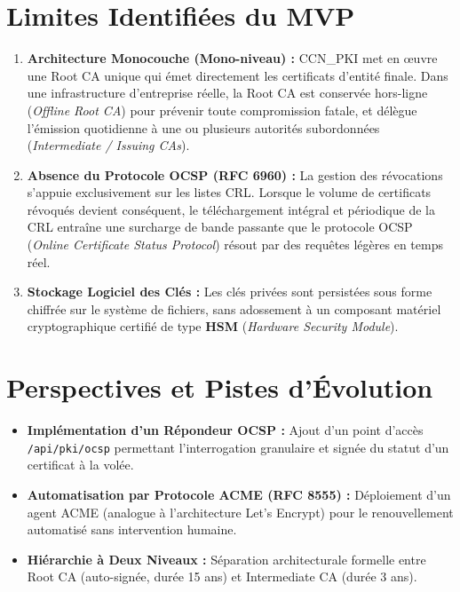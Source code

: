 \documentclass[12pt,a4paper]{report}
\begin{document}
\section{Limites Identifiées du MVP}
\begin{enumerate}
    \item \textbf{Architecture Monocouche (Mono-niveau) :} CCN\_PKI met en œuvre une Root CA unique qui émet directement les certificats d'entité finale. Dans une infrastructure d'entreprise réelle, la Root CA est conservée hors-ligne (\textit{Offline Root CA}) pour prévenir toute compromission fatale, et délègue l'émission quotidienne à une ou plusieurs autorités subordonnées (\textit{Intermediate / Issuing CAs}).
    \item \textbf{Absence du Protocole OCSP (RFC 6960) :} La gestion des révocations s'appuie exclusivement sur les listes CRL. Lorsque le volume de certificats révoqués devient conséquent, le téléchargement intégral et périodique de la CRL entraîne une surcharge de bande passante que le protocole OCSP (\textit{Online Certificate Status Protocol}) résout par des requêtes légères en temps réel.
    \item \textbf{Stockage Logiciel des Clés :} Les clés privées sont persistées sous forme chiffrée sur le système de fichiers, sans adossement à un composant matériel cryptographique certifié de type \textbf{HSM} (\textit{Hardware Security Module}).
\end{enumerate}

\section{Perspectives et Pistes d'Évolution}
\begin{itemize}
    \item \textbf{Implémentation d'un Répondeur OCSP :} Ajout d'un point d'accès \texttt{/api/pki/ocsp} permettant l'interrogation granulaire et signée du statut d'un certificat à la volée.
    \item \textbf{Automatisation par Protocole ACME (RFC 8555) :} Déploiement d'un agent ACME (analogue à l'architecture Let's Encrypt) pour le renouvellement automatisé sans intervention humaine.
    \item \textbf{Hiérarchie à Deux Niveaux :} Séparation architecturale formelle entre Root CA (auto-signée, durée 15 ans) et Intermediate CA (durée 3 ans).
\end{itemize}

\end{document}
